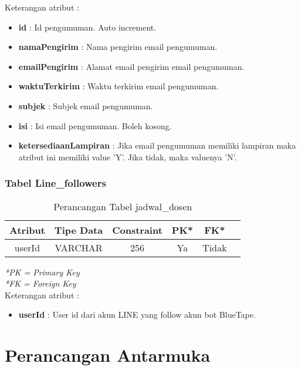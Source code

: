 Keterangan atribut :
\begin{itemize}
\item \textbf{id} : Id pengumuman. Auto increment.
\item \textbf{namaPengirim} : Nama pengirim email pengumuman.
\item \textbf{emailPengirim} : Alamat email pengirim email pengumuman.
\item \textbf{waktuTerkirim} : Waktu terkirim email pengumuman.
\item \textbf{subjek} : Subjek email pengumuman.
\item \textbf{isi} : Isi email pengumuman. Boleh kosong.
\item \textbf{ketersediaanLampiran} : Jika email pengumuman memiliki lampiran maka atribut ini memiliki value 'Y'. Jika tidak, maka valuenya 'N'.
\end{itemize}

\subsubsection{Tabel Line\_followers}
\begin{center}
	\begin{table}[H]
	\caption{Perancangan Tabel jadwal\_dosen}
	\begin{tabular}{|c|c|c|c|c|c|}
 			\hline
			\textbf{Atribut} & \textbf{Tipe Data} & \textbf{Constraint} & \textbf{PK*}  & \textbf{FK*} \\
			\hline
			 userId & VARCHAR & 256 & Ya & Tidak\\
            \hline
	\end{tabular}
	\end{table}
\end{center}
\textit{*PK = Primary Key} \\
\textit{*FK = Foreign Key} \\

Keterangan atribut :
\begin{itemize}
\item \textbf{userId} : User id dari akun LINE yang follow akun bot BlueTape.
\end{itemize}

\section{Perancangan Antarmuka}